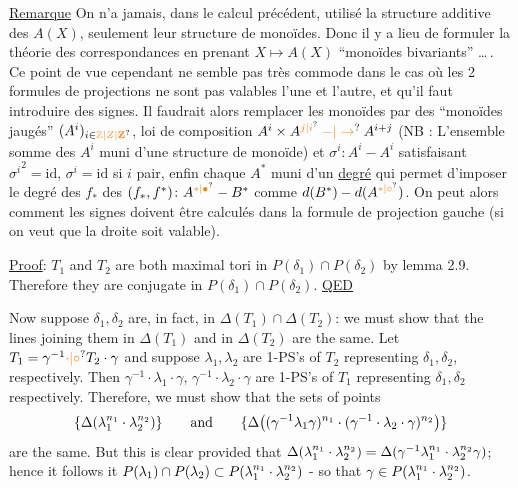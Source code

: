 \uline{Remarque} On n'a jamais, dans le calcul précédent, utilisé la structure additive des $A(X)$, seulement leur structure de monoïdes. Donc il y a lieu de formuler la théorie des correspondances en prenant  $X\mapsto A(X)$   ``monoïdes bivariants'' \ldots\,.  Ce point de vue cependant ne semble pas très commode dans le cas où les 2 formules de projections  ne sont pas valables l'une et l'autre, et qu'il faut introduire des signes. Il faudrait alors remplacer les monoïdes par des ``monoïdes jaugés'' $(A^i)_{i\in\unsure{\mathbb Z|Z|\mathbf{Z}}}$, loi de composition $A^i\times A^{\unsure{j|i}}\mathbin{\unsure{-|\to}} A^{i+j}$ (NB : L'ensemble somme des $A^i$  muni d'une structure de monoïde) et   $\sigma^i\colon A^i\mathbin{-} A^i$ satisfaisant $ {\sigma^i}^{2}=\mathrm{id}$, $\sigma^i=\mathrm{id}$ si $i$ pair,  enfin chaque $A^*$ muni d'un \uline{degré}  qui permet d'imposer le degré des $f_*$ des $(f_*,f^*)\colon A^{\unsure{*|\bullet}}\mathbin{-}B^*$ comme  $d(B^*)-d(A^{\unsure{*|\circ}})$. On peut alors  comment les signes doivent être calculés dans la formule de projection gauche (si on veut que la droite soit valable).

\uline{Proof}: $T_1$ and $T_2$ are both maximal tori in $P(\delta_1)\cap P(\delta_2)$ by lemma 2.9. Therefore they are conjugate in $P(\delta_1)\cap P(\delta_2)$. \hfill\uline{QED}

Now suppose $\delta_1,\delta_2$ are, in fact, in $\Delta(T_1)\cap\Delta(T_2)$: we must show that the lines joining them in $\Delta(T_1)$ and in $\Delta(T_2)$ are the same. Let $T_1=\gamma^{-1}\unsure{\cdot|\circ} T_2\cdot\gamma$ and suppose $\lambda_1,\lambda_2$ are 1-PS's of $T_2$ representing $\delta_1,\delta_2$, respectively. Then $\gamma^{-1}\cdot\lambda_1\cdot\gamma$, $\gamma^{-1}\cdot\lambda_2\cdot\gamma$ are 1-PS's of $T_1$ representing $\delta_1,\delta_2$ respectively. Therefore, we must show that the sets of points
\[
 \{\Delta(\lambda_1^{n_1}\cdot\lambda_2^{n_2})\}
 \qquad\text{and}\qquad
 \{\Delta\bigl((\gamma^{-1}\lambda_1\gamma)^{n_1}\cdot(\gamma^{-1}\cdot\lambda_2\cdot\gamma)^{n_2}\bigr)\}
\]
are the same. But this is clear provided that $\Delta(\lambda_1^{n_1}\cdot\lambda_2^{n_2})=\Delta(\gamma^{-1}\lambda_1^{n_1}\cdot\lambda_2^{n_2}\gamma)$; hence it follows it $P(\lambda_1)\cap P(\lambda_2)\subset P(\lambda_1^{n_1}\cdot\lambda_2^{n_2})$ - so that $\gamma\in P(\lambda_1^{n_1}\cdot\lambda_2^{n_2})$.

